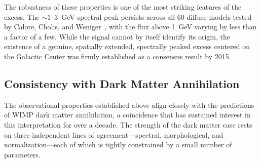 The robustness of these properties is one of the most striking features of the excess.
The $\sim 1$--$3$~GeV spectral peak persists across all 60 diffuse models tested by Calore, Cholis, and Weniger~\cite{Calore:2014xka}, with the flux above 1~GeV varying by less than a factor of a few.
While the signal cannot by itself identify its origin, the existence of a genuine, spatially extended, spectrally peaked excess centered on the Galactic Center was firmly established as a consensus result by 2015.

\subsection{Consistency with Dark Matter Annihilation}
\label{sec:4.1.4}

The observational properties established above align closely with the predictions of WIMP dark matter annihilation, a coincidence that has sustained interest in this interpretation for over a decade.
The strength of the dark matter case rests on three independent lines of agreement---spectral, morphological, and normalization---each of which is tightly constrained by a small number of parameters.

